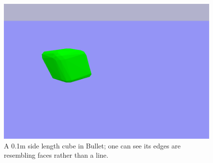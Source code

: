 \begin{figure}[h]
\center
\includegraphics[scale=0.8]{small_cuboid.png}
\caption{A 0.1m side length cube in Bullet; one can see its edges are resembling faces rather than a line.}
\label{fig:square_p}
\end{figure}\\\\